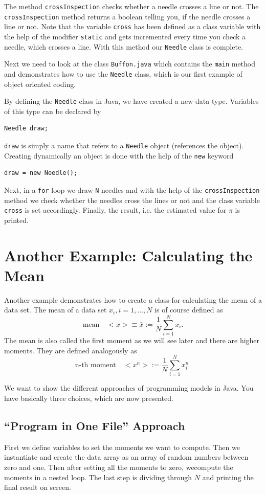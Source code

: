 The method \verb|crossInspection| checks whether
a needle crosses a line or not. The \verb|crossInspection| method
returns a boolean telling you, if the needle crosses a line or not.
Note that the variable \verb|cross| has
been defined as a class variable with the help of the modifier \verb|static|
and gets incremented every time you check a needle, which crosses a line.
With this method our \verb|Needle| class is complete.

Next we need to look at the class \verb|Buffon.java| which contains the
\verb|main| method and demonstrates how to use the \verb|Needle| class,
which is our first example of object oriented coding.

By defining the \verb|Needle| class in Java, we have created a new
data type. Variables of this type can be declared by
\begin{verbatim}
Needle draw;
\end{verbatim}
\verb|draw| is simply a name that refers to a \verb|Needle|
object (references the object). 
Creating dynamically an object
is done with the help of the \verb|new| keyword
\begin{verbatim}
draw = new Needle();
\end{verbatim}
Next, in a \verb|for| loop we draw \verb|N|  needles and with the help
of the \verb|crossInspection| method we check whether the needles
cross the lines or not and the class variable \verb|cross| is set
accordingly. Finally, the result, i.e. the estimated value
for $\pi$ is printed.



\section{Another Example: Calculating the Mean}
Another example demonstrates how to create a class for calculating
the mean of a data set. The mean of a data set $x_i, i=1,\ldots,N$ 
is of course defined as
$$ \text{mean}\quad  <x> \equiv \bar{x} := \frac{1}{N}\sum_{i=1}^{N} x_i.$$ 
The mean is also called the first moment as we will see later and
there are higher moments. They are defined analogously
as
$$ \text{n-th moment}\quad <x^n> :=  \frac{1}{N}\sum_{i=1}^{N} x_i^n.$$  
 
We want to show the
different approaches of programming models in Java. 
You have basically three choices, which are now presented.

\subsection{``Program in One File'' Approach}
First we define variables to set the moments we want to compute.
Then we instantiate and create the data array as an array of
random numbers between zero and one. Then after setting all the moments
to zero, wecompute the moments in a nested loop. The last step
is dividing through $N$ and printing the final result on screen.



